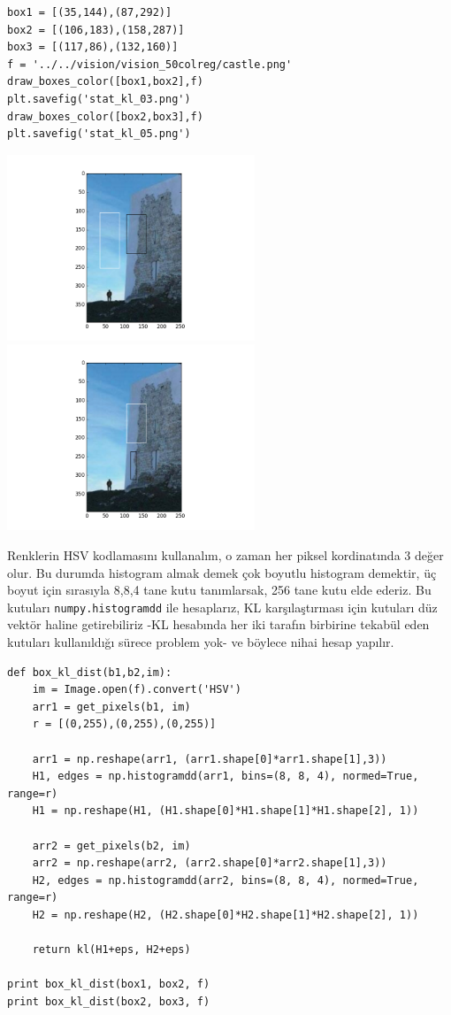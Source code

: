 \documentclass[12pt,fleqn]{article}\usepackage{../../common}
\begin{document}
\begin{verbatim}
box1 = [(35,144),(87,292)]
box2 = [(106,183),(158,287)]
box3 = [(117,86),(132,160)]
f = '../../vision/vision_50colreg/castle.png'
draw_boxes_color([box1,box2],f)
plt.savefig('stat_kl_03.png')
draw_boxes_color([box2,box3],f)
plt.savefig('stat_kl_05.png')
\end{verbatim}

\includegraphics[width=20em]{stat_kl_03.png}
\includegraphics[width=20em]{stat_kl_05.png}

Renklerin HSV kodlamasını kullanalım, o zaman her piksel kordinatında 3
değer olur. Bu durumda histogram almak demek çok boyutlu histogram
demektir, üç boyut için sırasıyla 8,8,4 tane kutu tanımlarsak, 256 tane
kutu elde ederiz. Bu kutuları \verb!numpy.histogramdd! ile hesaplarız, KL
karşılaştırması için kutuları düz vektör haline getirebiliriz -KL hesabında
her iki tarafın birbirine tekabül eden kutuları kullanıldığı sürece problem
yok- ve böylece nihai hesap yapılır.

\begin{verbatim}
def box_kl_dist(b1,b2,im):
    im = Image.open(f).convert('HSV')
    arr1 = get_pixels(b1, im)
    r = [(0,255),(0,255),(0,255)]

    arr1 = np.reshape(arr1, (arr1.shape[0]*arr1.shape[1],3))
    H1, edges = np.histogramdd(arr1, bins=(8, 8, 4), normed=True, range=r)
    H1 = np.reshape(H1, (H1.shape[0]*H1.shape[1]*H1.shape[2], 1))

    arr2 = get_pixels(b2, im)
    arr2 = np.reshape(arr2, (arr2.shape[0]*arr2.shape[1],3))
    H2, edges = np.histogramdd(arr2, bins=(8, 8, 4), normed=True, range=r)
    H2 = np.reshape(H2, (H2.shape[0]*H2.shape[1]*H2.shape[2], 1))

    return kl(H1+eps, H2+eps)

print box_kl_dist(box1, box2, f)
print box_kl_dist(box2, box3, f)
\end{verbatim}
\end{document}
